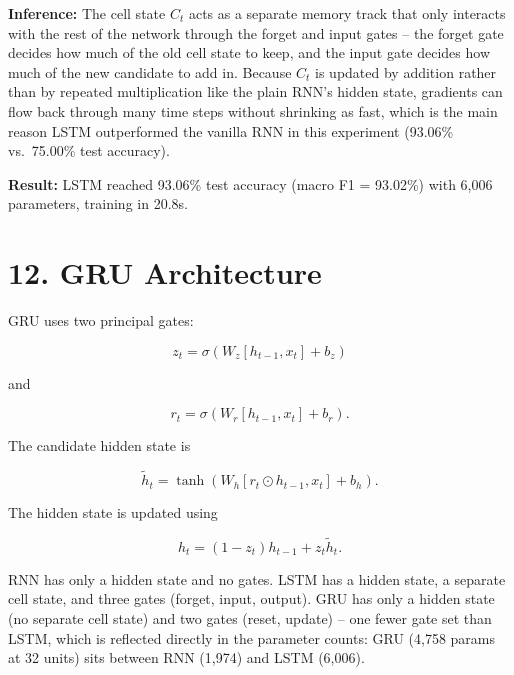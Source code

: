 \documentclass[10pt]{article}
\begin{document}
\textbf{Inference:} The cell state $C_t$ acts as a separate memory track that
only interacts with the rest of the network through the forget and input
gates -- the forget gate decides how much of the old cell state to keep, and
the input gate decides how much of the new candidate to add in. Because
$C_t$ is updated by addition rather than by repeated multiplication like the
plain RNN's hidden state, gradients can flow back through many time steps
without shrinking as fast, which is the main reason LSTM outperformed the
vanilla RNN in this experiment (93.06\% vs.\ 75.00\% test accuracy).

\textbf{Result:} LSTM reached 93.06\% test accuracy (macro F1 = 93.02\%)
with 6,006 parameters, training in 20.8s.

\section*{12. GRU Architecture}

GRU uses two principal gates:

\[
z_t=\sigma(W_z[h_{t-1},x_t]+b_z)
\]

and

\[
r_t=\sigma(W_r[h_{t-1},x_t]+b_r).
\]

The candidate hidden state is

\[
\tilde{h}_t=
\tanh(W_h[r_t\odot h_{t-1},x_t]+b_h).
\]

The hidden state is updated using

\[
h_t=(1-z_t)h_{t-1}+z_t\tilde{h}_t.
\]

\begin{center}
\end{center}

RNN has only a hidden state and no gates. LSTM has a hidden state, a
separate cell state, and three gates (forget, input, output). GRU has only
a hidden state (no separate cell state) and two gates (reset, update) --
one fewer gate set than LSTM, which is reflected directly in the parameter
counts: GRU (4,758 params at 32 units) sits between RNN (1,974) and LSTM
(6,006).
\end{document}
